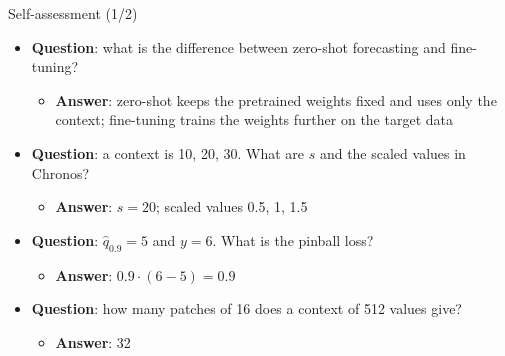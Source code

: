 \begin{frame}{Self-assessment (1/2)}
\itemsize{\small}
\begin{itemize}
    \item \textbf{Question}: what is the difference between zero-shot forecasting and fine-tuning?
    \begin{itemize}
        \item \textbf{Answer}: zero-shot keeps the pretrained weights fixed and uses only the context; fine-tuning trains the weights further on the target data
    \end{itemize}
    \item \textbf{Question}: a context is 10, 20, 30. What are $s$ and the scaled values in Chronos?
    \begin{itemize}
        \item \textbf{Answer}: $s = 20$; scaled values 0.5, 1, 1.5
    \end{itemize}
    \item \textbf{Question}: $\hat q_{0.9} = 5$ and $y = 6$. What is the pinball loss?
    \begin{itemize}
        \item \textbf{Answer}: $0.9 \cdot (6 - 5) = 0.9$
    \end{itemize}
    \item \textbf{Question}: how many patches of 16 does a context of 512 values give?
    \begin{itemize}
        \item \textbf{Answer}: 32
    \end{itemize}
\end{itemize}
\end{frame}

